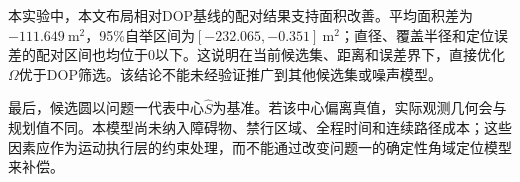 本实验中，本文布局相对DOP基线的配对结果支持面积改善。平均面积差为$-111.649\ \mathrm{m^2}$，95\%自举区间为$[-232.065,-0.351]\ \mathrm{m^2}$；直径、覆盖半径和定位误差的配对区间也均位于0以下。这说明在当前候选集、距离和误差界下，直接优化$\Omega$优于DOP筛选。该结论不能未经验证推广到其他候选集或噪声模型。

最后，候选圆以问题一代表中心$\widehat S$为基准。若该中心偏离真值，实际观测几何会与规划值不同。本模型尚未纳入障碍物、禁行区域、全程时间和连续路径成本；这些因素应作为运动执行层的约束处理，而不能通过改变问题一的确定性角域定位模型来补偿。



